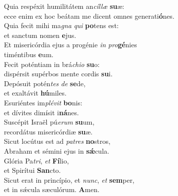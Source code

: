 \oddverse Quia respéxit humilitátem an\textit{cíl}\textit{læ} \textbf{su}æ:~\*\\
\oddverse ecce enim ex hoc beátam me dicent omnes generati\textbf{ó}nes.\\
\evenverse Quia fecit mihi ma\textit{gna} \textit{qui} \textbf{po}tens est:~\*\\
\evenverse et sanctum nomen \textbf{e}jus.\\
\oddverse Et misericórdia ejus a progénie \textit{in} \textit{pro}\textbf{gé}nies~\*\\
\oddverse timéntibus \textbf{e}um.\\
\evenverse Fecit poténtiam in brá\textit{chi}\textit{o} \textbf{su}o:~\*\\
\evenverse dispérsit supérbos mente cordis \textbf{su}i.\\
\oddverse Depósuit potén\textit{tes} \textit{de} \textbf{se}de,~\*\\
\oddverse et exaltávit \textbf{hú}miles.\\
\evenverse Esuriéntes im\textit{plé}\textit{vit} \textbf{bo}nis:~\*\\
\evenverse et dívites dimísit i\textbf{ná}nes.\\
\oddverse Suscépit Israël pú\textit{e}\textit{rum} \textbf{su}um,~\*\\
\oddverse recordátus misericórdiæ \textbf{su}æ.\\
\evenverse Sicut locútus est ad \textit{pa}\textit{tres} \textbf{no}stros,~\*\\
\evenverse Abraham et sémini ejus in \textbf{sǽ}cula.\\
\oddverse Glória Pa\textit{tri}, \textit{et} \textbf{Fí}lio,~\*\\
\oddverse et Spirítui \textbf{San}cto.\\
\evenverse Sicut erat in princípio, et \textit{nunc}, \textit{et} \textbf{sem}per,~\*\\
\evenverse et in sǽcula sæculórum. \textbf{A}men.\\
